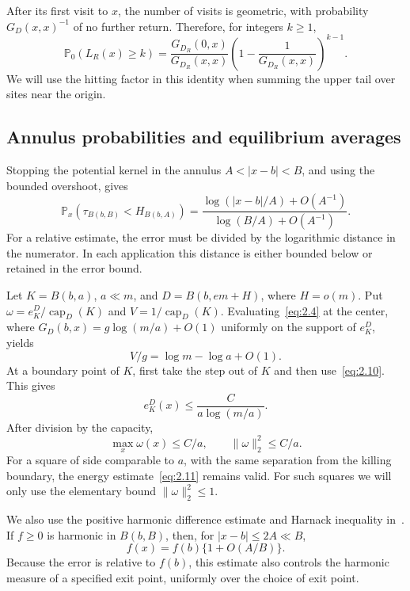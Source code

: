 \documentclass[11pt,a4paper]{article}
\numberwithin{equation}{section}
\theoremstyle{remark}
\begin{document}
After its first visit to $x$, the number of visits is geometric, with probability $G_D(x,x)^{-1}$ of no further return. Therefore, for integers $k\ge1$,
\begin{equation}\label{eq:2.9}
\mathbb P_0(L_R(x)\ge k)=
\frac{G_{D_R}(0,x)}{G_{D_R}(x,x)}
\left(1-\frac1{G_{D_R}(x,x)}\right)^{k-1}.
\end{equation}
We will use the hitting factor in this identity when summing the upper tail over sites near the origin.

\subsection{Annulus probabilities and equilibrium averages}\label{sec:annuli}
Stopping the potential kernel in the annulus $A<|x-b|<B$, and using the bounded overshoot, gives
\begin{equation}\label{eq:2.10}
\mathbb P_x(\tau_{B(b,B)}<H_{B(b,A)})
=\frac{\log(|x-b|/A)+O(A^{-1})}
       {\log(B/A)+O(A^{-1})}.
\end{equation}
For a relative estimate, the error must be divided by the logarithmic distance in the numerator. In each application this distance is either bounded below or retained in the error bound.

Let $K=B(b,a)$, $a\ll m$, and $D=B(b,em+H)$, where $H=o(m)$. Put
$\omega=e_K^D/\operatorname{cap}_D(K)$ and $V=1/\operatorname{cap}_D(K)$.
Evaluating~\eqref{eq:2.4} at the center, where $G_D(b,x)=g\log(m/a)+O(1)$ uniformly on the support of $e_K^D$, yields
\begin{equation}\label{eq:2.11}
V/g=\log m-\log a+O(1).
\end{equation}
At a boundary point of $K$, first take the step out of $K$ and then use~\eqref{eq:2.10}. This gives
\[
e_K^D(x)\le\frac{C}{a\log(m/a)}.
\]
After division by the capacity,
\begin{equation}\label{eq:2.12}
\max_x\omega(x)\le C/a,\qquad \|\omega\|_2^2\le C/a.
\end{equation}
For a square of side comparable to $a$, with the same separation from the killing boundary, the energy estimate~\eqref{eq:2.11} remains valid. For such squares we will only use the elementary bound $\|\omega\|_2^2\le1$.

We also use the positive harmonic difference estimate and Harnack inequality in~\cite[Theorems 6.3.8(b) and 6.3.9]{LL}. If $f\ge0$ is harmonic in $B(b,B)$, then, for $|x-b|\le2A\ll B$,
\begin{equation}\label{eq:2.13}
f(x)=f(b)\{1+O(A/B)\}.
\end{equation}
Because the error is relative to $f(b)$, this estimate also controls the harmonic measure of a specified exit point, uniformly over the choice of exit point.
\end{document}
